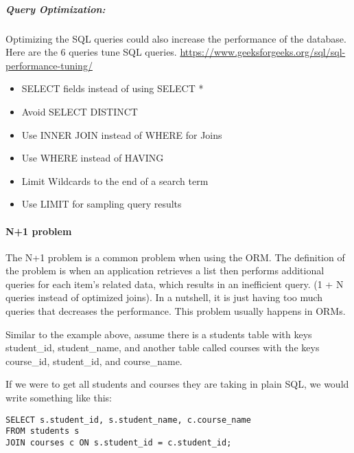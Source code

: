 \subparagraph{Query Optimization:}
Optimizing the SQL queries could also increase the performance of the database. Here are the 6 queries tune SQL queries. 
\url{https://www.geeksforgeeks.org/sql/sql-performance-tuning/}
\begin{itemize}
    \item SELECT fields instead of using SELECT *
    \item Avoid SELECT DISTINCT
    \item Use INNER JOIN instead of WHERE for Joins
    \item Use WHERE instead of HAVING
    \item Limit Wildcards to the end of a search term
    \item Use LIMIT for sampling query results
\end{itemize}

\paragraph{N+1 problem}
The N+1 problem is a common problem when using the ORM. The definition of the problem is when an application retrieves a list then performs additional queries for each item’s related data, which results in an inefficient query. (1 + N queries instead of optimized joins). In a nutshell, it is just having too much queries that decreases the performance. This problem usually happens in ORMs. 

Similar to the example above, assume there is a students table with keys student\_id, student\_name, and another table called courses with the keys course\_id, student\_id, and course\_name. 

If we were to get all students and courses they are taking in plain SQL, we would write something like this:
\begin{verbatim}
SELECT s.student_id, s.student_name, c.course_name
FROM students s
JOIN courses c ON s.student_id = c.student_id;
\end{verbatim}
